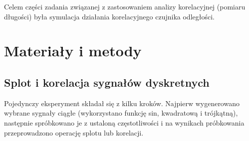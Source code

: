 \documentclass{article}
\begin{document}
Celem części zadania związanej z zastosowaniem analizy korelacyjnej (pomiaru długości) była symulacja działania korelacyjnego czujnika odległości. 


\section{Materiały i metody} 
    \subsection{Splot i korelacja sygnałów dyskretnych} {
        Pojedynczy eksperyment składał się z kilku kroków. Najpierw wygenerowano wybrane sygnały
        ciągłe (wykorzystano funkcję sin, kwadratową i trójkątną), następnie spróbkowano je z
        ustaloną częstotliwości i na wynikach próbkowania przeprowadzono operację splotu lub
        korelacji.
    }
\end{document}

